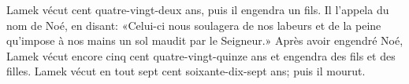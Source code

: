Lamek vécut cent quatre-vingt-deux ans, puis il engendra un fils.
Il l’appela du nom de Noé, en disant:
	«Celui-ci nous soulagera de nos labeurs
	et de la peine qu’impose à nos mains un sol maudit par le Seigneur.»
Après avoir engendré Noé,
	Lamek vécut encore cinq cent quatre-vingt-quinze ans
	et engendra des fils et des filles.
Lamek vécut en tout sept cent soixante-dix-sept ans; puis il mourut.
